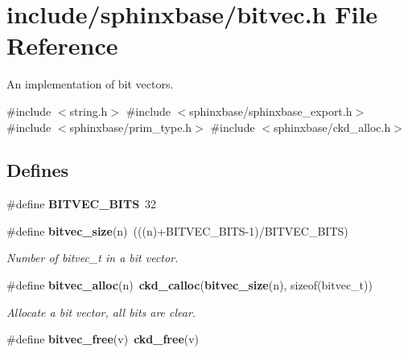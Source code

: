 \section{include/sphinxbase/bitvec.h \-File \-Reference}
\label{bitvec_8h}


\-An implementation of bit vectors.  


{\ttfamily \#include $<$string.\-h$>$}\*
{\ttfamily \#include $<$sphinxbase/sphinxbase\-\_\-export.\-h$>$}\*
{\ttfamily \#include $<$sphinxbase/prim\-\_\-type.\-h$>$}\*
{\ttfamily \#include $<$sphinxbase/ckd\-\_\-alloc.\-h$>$}\*
\subsection*{\-Defines}
\begin{DoxyCompactItemize}
\item 
\#define {\bfseries \-B\-I\-T\-V\-E\-C\-\_\-\-B\-I\-T\-S}~32\label{bitvec_8h_aa992f8d4c7dbe0b71bfd1e01ce279167}

\item 
\#define {\bf bitvec\-\_\-size}(n)~(((n)+\-B\-I\-T\-V\-E\-C\-\_\-\-B\-I\-T\-S-\/1)/\-B\-I\-T\-V\-E\-C\-\_\-\-B\-I\-T\-S)\label{bitvec_8h_a1d82193826583f234a71cba32267d3f3}

\begin{DoxyCompactList}\small\item\em \-Number of bitvec\-\_\-t in a bit vector. \end{DoxyCompactList}\item 
\#define {\bf bitvec\-\_\-alloc}(n)~{\bf ckd\-\_\-calloc}({\bf bitvec\-\_\-size}(n), sizeof(bitvec\-\_\-t))\label{bitvec_8h_a866043a7ac23e137f6c2f2466f4abc70}

\begin{DoxyCompactList}\small\item\em \-Allocate a bit vector, all bits are clear. \end{DoxyCompactList}\item 
\#define {\bf bitvec\-\_\-free}(v)~{\bf ckd\-\_\-free}(v)\label{bitvec_8h_a5628e35c88ac7e91b99dce916758824a}


\end{DoxyCompactItemize}
